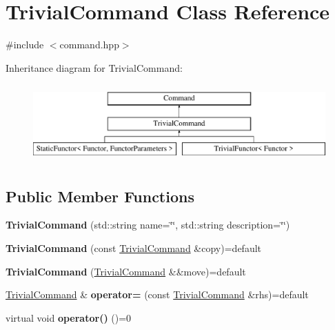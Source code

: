 \hypertarget{class_trivial_command}{}\section{Trivial\+Command Class Reference}
\label{class_trivial_command}


{\ttfamily \#include $<$command.\+hpp$>$}

Inheritance diagram for Trivial\+Command\+:\begin{figure}[H]
\begin{center}
\leavevmode
\includegraphics[height=3.000000cm]{class_trivial_command}
\end{center}
\end{figure}
\subsection*{Public Member Functions}
\begin{DoxyCompactItemize}
\item 
\mbox{\label{class_trivial_command_aa04f1b1e89d9b70d18abb1979f7a176f}} 
{\bfseries Trivial\+Command} (std\+::string name=\char`\"{}\char`\"{}, std\+::string description=\char`\"{}\char`\"{})
\item 
\mbox{\label{class_trivial_command_aac7f01c15634087676f76fdc12a14a79}} 
{\bfseries Trivial\+Command} (const \mbox{\hyperlink{class_trivial_command}{Trivial\+Command}} \&copy)=default
\item 
\mbox{\label{class_trivial_command_ae2f84a7ac26dc67a55b67dfdc7be54cd}} 
{\bfseries Trivial\+Command} (\mbox{\hyperlink{class_trivial_command}{Trivial\+Command}} \&\&move)=default
\item 
\mbox{\label{class_trivial_command_a03d7829b8abd891128503a863c1824ff}} 
\mbox{\hyperlink{class_trivial_command}{Trivial\+Command}} \& {\bfseries operator=} (const \mbox{\hyperlink{class_trivial_command}{Trivial\+Command}} \&rhs)=default
\item 
\mbox{\label{class_trivial_command_aa61a3e5fd78d3a2dec6fcf6dcb2e5189}} 
virtual void {\bfseries operator()} ()=0
\end{DoxyCompactItemize}
